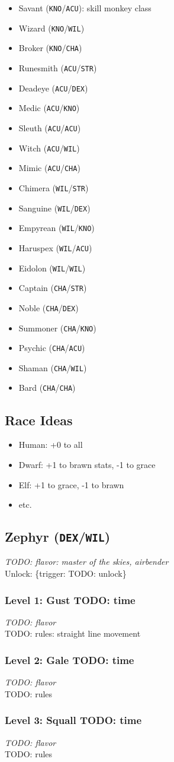 \documentclass[12pt]{article}
\newcommand{\STR}{\texttt{STR}}
\newcommand{\DEX}{\texttt{DEX}}
\newcommand{\KNO}{\texttt{KNO}}
\newcommand{\ACU}{\texttt{ACU}}
\newcommand{\WIL}{\texttt{WIL}}
\newcommand{\CHA}{\texttt{CHA}}
\newcommand{\TRIG}[1]{\{trigger: #1\}}
\newcommand{\Class}[4]{\pagebreak\subsection{#1 (#2)}\label{#1}\textit{#3}\\[1mm]Unlock: \TRIG{#4}}
\newcommand{\Skill}[5]{\subsubsection{Level #1: #2 #3}\textit{#4}\\[1mm]#5}
\begin{document}
\begin{itemize}
\Skill{TODO}{Plan}{TODO: time}
{TODO: flavor}
{TODO: rules: reward for readying actions}

\item Savant (\KNO/\ACU): skill monkey class
\item Wizard (\KNO/\WIL)
\item Broker (\KNO/\CHA)
\item Runesmith (\ACU/\STR)
\item Deadeye (\ACU/\DEX)
\item Medic (\ACU/\KNO)
\item Sleuth (\ACU/\ACU)
\item Witch (\ACU/\WIL)
\item Mimic (\ACU/\CHA)
\item Chimera (\WIL/\STR)
\item Sanguine (\WIL/\DEX)
\item Empyrean (\WIL/\KNO)
\item Haruspex (\WIL/\ACU)
\item Eidolon (\WIL/\WIL)
\item Captain (\CHA/\STR)
\item Noble (\CHA/\DEX)
\item Summoner (\CHA/\KNO)
\item Psychic (\CHA/\ACU)
\item Shaman (\CHA/\WIL)
\item Bard (\CHA/\CHA)
\end{itemize}

\subsection{Race Ideas}
\begin{itemize}
\item Human: +0 to all
\item Dwarf: +1 to brawn stats, -1 to grace
\item Elf: +1 to grace, -1 to brawn
\item etc.
\end{itemize}

%

\Class{Zephyr}{\DEX/\WIL}
{TODO: flavor: master of the skies, airbender}
{TODO: unlock}

\Skill{1}{Gust}{TODO: time}
{TODO: flavor}
{TODO: rules: straight line movement}

\Skill{2}{Gale}{TODO: time}
{TODO: flavor}
{TODO: rules}

\Skill{3}{Squall}{TODO: time}
{TODO: flavor}
{TODO: rules}
\end{document}
